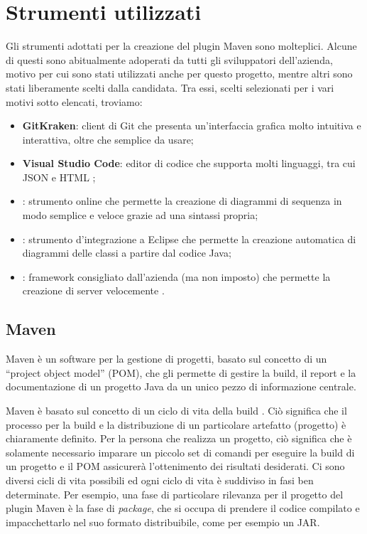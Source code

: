 \section{Strumenti utilizzati}
Gli strumenti adottati per la creazione del plugin Maven sono molteplici.
Alcune di questi sono abitualmente adoperati da tutti gli sviluppatori dell'azienda, motivo per cui sono stati utilizzati anche per questo progetto, mentre altri sono stati liberamente scelti dalla candidata.
Tra essi, scelti selezionati per i vari motivi sotto elencati, troviamo:
\begin{itemize}
    \item \textbf{GitKraken}: client di Git che presenta un'interfaccia grafica molto intuitiva e interattiva, oltre che semplice da usare;
    \item \textbf{Visual Studio Code}: editor di codice che supporta molti linguaggi, tra cui JSON e HTML \cite{site:visual-studio-code};
    \item {}: strumento online che permette la creazione di diagrammi di sequenza in modo semplice e veloce grazie ad una sintassi propria;
    \item {}: strumento d'integrazione a Eclipse che permette la creazione automatica di diagrammi delle classi a partire dal codice Java;
    \item {}: framework consigliato dall'azienda (ma non imposto) che permette la creazione di server velocemente \cite{site:meecrowave}.
\end{itemize}

    \subsection{Maven} \label{mavenSection} %
        
    Maven \cite{site:maven-introduzione} è un software per la gestione di progetti, basato sul concetto di un ``project object model'' (POM), che gli permette di gestire la build, il report e la documentazione di un progetto Java da un unico pezzo di informazione centrale.

    Maven è basato sul concetto di un ciclo di vita della build \cite{site:maven-lifecycle}.
    Ciò significa che il processo per la build e la distribuzione di un particolare artefatto (progetto) è chiaramente definito. 
    Per la persona che realizza un progetto, ciò significa che è solamente necessario imparare un piccolo set di comandi per eseguire la build di un progetto e il POM assicurerà l'ottenimento dei risultati desiderati.
    Ci sono diversi cicli di vita possibili ed ogni ciclo di vita è suddiviso in fasi ben determinate.
    Per esempio, una fase di particolare rilevanza per il progetto del plugin Maven è la fase di \emph{package}, che si occupa di prendere il codice compilato e impacchettarlo nel suo formato distribuibile, come per esempio un JAR. 

